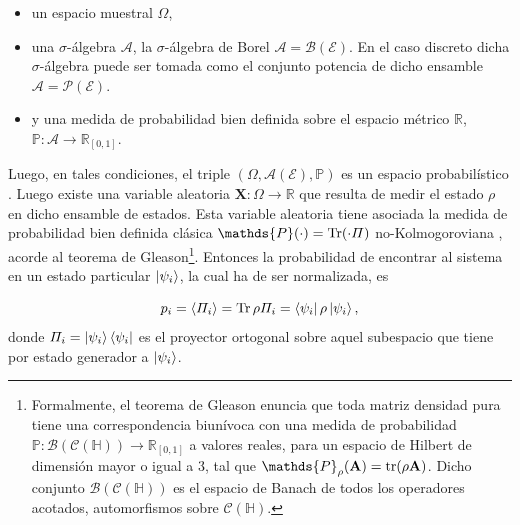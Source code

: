 \documentclass{report} %
\numberwithin{equation}{section}
\begin{document}
\begin{itemize}
    \item un espacio muestral $\Omega$,
    \item una $\sigma$-álgebra $\mathcal{A}$, la $\sigma$-álgebra de Borel $\mathcal{A}=\mathcal{B}(\mathcal{E})$. En el caso discreto dicha $\sigma$-álgebra puede ser tomada como el conjunto potencia de dicho ensamble $\mathcal{A} = \mathcal{P}(\mathcal{E})$. 
    \item y una medida de probabilidad bien definida sobre el espacio métrico $\mathds{R}$, $\mathds{P}: \mathcal{A} \rightarrow \mathds{R}_{[0,1]}$.
\end{itemize}

Luego, en tales condiciones, el triple $(\Omega, \mathcal{A}(\mathcal{E}), \mathds{P})$ es un espacio probabilístico \cite{Bartle1995, munkres}. Luego existe una variable aleatoria $\mathbf{X}: \Omega \rightarrow \mathds{R}$ que resulta de medir el estado $\rho$ en dicho ensamble de estados. Esta variable aleatoria tiene asociada la medida de probabilidad bien definida clásica $\mathds{P}(\cdot) = \Tr(\cdot \Pi)$ no-Kolmogoroviana \cite{HeinzPetruccione, Portesi-ECI34, Holik-ECI34}, acorde al teorema de Gleason\footnote{Formalmente, el teorema de Gleason enuncia que toda matriz densidad pura tiene una correspondencia biunívoca con una medida de probabilidad $\mathds{P}: \mathcal{B}(\mathcal{C}(\mathds{H})) \rightarrow \mathds{R}_{[0,1]}$ a valores reales, para un espacio de Hilbert de dimensión mayor o igual a 3, tal que $\mathds{P}_{\rho} ({\bf A}) = \tr (\rho {\bf A})$. Dicho conjunto $\mathcal{B}(\mathcal{C}(\mathds{H}))$ es el espacio de Banach \cite{HoracioI} de todos los operadores acotados, automorfismos sobre $\mathcal{C}(\mathds{H})$.}. Entonces la probabilidad de encontrar al sistema en un estado particular $\ket{\psi_i}$, la cual ha de ser normalizada, es

\begin{equation}
    p_i = \langle \Pi_i \rangle = \Tr \rho \Pi_i = \bra{\psi_i}\rho\ket{\psi_i},
\end{equation}
donde $\Pi_i = \ket{\psi_i}\bra{\psi_i}$ es el proyector ortogonal sobre aquel subespacio que tiene por estado generador a $\ket{\psi_i}$. 
\end{document}
